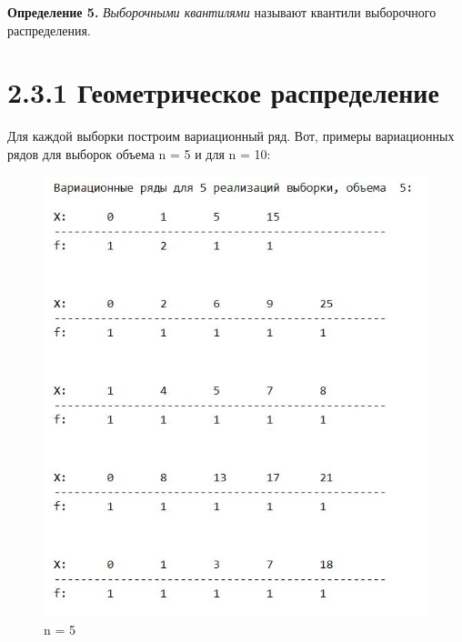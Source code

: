 \documentclass[a4paper,12pt, oneside]{book}
\begin{document}
\normalsize{\textbf{Определение 5.}} \textit{Выборочными квантилями } называют квантили выборочного распределения.
\setcounter{secnumdepth}{-1} %
\vspace{5mm}
\section{2.3.1 Геометрическое распределение}
\vspace{5mm}



Для каждой выборки построим вариационный ряд. Вот, примеры вариационных рядов для выборок объема n = 5 и для n = 10:

\begin{figure}[h!]
	\begin{center}
		\begin{minipage}[h]{0.4\linewidth}
			\includegraphics[width=1\linewidth]{var_ser_5.jpg}
			\caption{n = 5} %
		\end{minipage}
		\hfill
		\begin{minipage}[h]{0.4\linewidth}

\end{minipage}
\end{center}
\end{figure}
\end{document}
